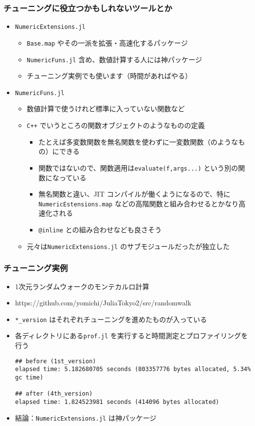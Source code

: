  \begin{frame}[containsverbatim]
 \frametitle{チューニングに役立つかもしれないツールとか}
 \begin{itemize}
   \item \verb|NumericExtensions.jl|
     \begin{itemize}
       \item \verb|Base.map| やその一派を拡張・高速化するパッケージ
       \item \verb|NumericFuns.jl| 含め、数値計算する人には神パッケージ
       \item チューニング実例でも使います（時間があればやる）
     \end{itemize}
   \item \verb|NumericFuns.jl|
     \begin{itemize}
       \item 数値計算で使うけれど標準に入っていない関数など
       \item \verb|C++| でいうところの関数オブジェクトのようなものの定義
         \begin{itemize}
           \item たとえば多変数関数を無名関数を使わずに一変数関数（のようなもの）にできる
           \item 関数ではないので、関数適用は\verb|evaluate(f,args...)| という別の関数になっている 
           \item 無名関数と違い、JIT コンパイルが働くようになるので、特に\verb|NumericEstensions.map| などの高階関数と組み合わせるとかなり高速化される
           \item \verb|@inline| との組み合わせなども良さそう
         \end{itemize}
       \item 元々は\verb|NumericExtensions.jl| のサブモジュールだったが独立した
     \end{itemize}
 \end{itemize}
 \end{frame}

 \begin{frame}[containsverbatim]
 \frametitle{チューニング実例}
 \begin{itemize}
   \item 1次元ランダムウォークのモンテカルロ計算
   \item https://github.com/yomichi/JuliaTokyo2/src/randomwalk
   \item \verb|*_version| はそれぞれチューニングを進めたものが入っている
   \item 各ディレクトリにある\verb|prof.jl| を実行すると時間測定とプロファイリングを行う
\begin{lstlisting}
## before (1st_version)
elapsed time: 5.182680705 seconds (803357776 bytes allocated, 5.34% gc time)

## after (4th_version)
elapsed time: 1.824523981 seconds (414096 bytes allocated)
\end{lstlisting}
\item 結論：\verb|NumericExtensions.jl| は神パッケージ
 \end{itemize}
 \end{frame}
